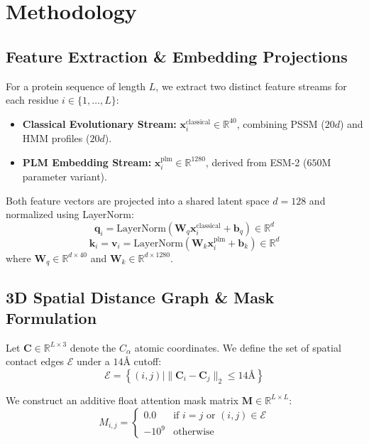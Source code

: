\documentclass[10pt,journal,compsoc]{IEEEtran}
\begin{document}
\section{Methodology}

\subsection{Feature Extraction \& Embedding Projections}
For a protein sequence of length $L$, we extract two distinct feature streams for each residue $i \in \{1, \dots, L\}$:
\begin{itemize}
    \item \textbf{Classical Evolutionary Stream:} $\mathbf{x}_i^{\text{classical}} \in \mathbb{R}^{40}$, combining PSSM ($20d$) and HMM profiles ($20d$).
    \item \textbf{PLM Embedding Stream:} $\mathbf{x}_i^{\text{plm}} \in \mathbb{R}^{1280}$, derived from ESM-2 ($650\text{M}$ parameter variant).
\end{itemize}

Both feature vectors are projected into a shared latent space $d = 128$ and normalized using LayerNorm:
\begin{equation}
\mathbf{q}_i = \text{LayerNorm}(\mathbf{W}_q \mathbf{x}_i^{\text{classical}} + \mathbf{b}_q) \in \mathbb{R}^d
\end{equation}
\begin{equation}
\mathbf{k}_i = \mathbf{v}_i = \text{LayerNorm}(\mathbf{W}_k \mathbf{x}_i^{\text{plm}} + \mathbf{b}_k) \in \mathbb{R}^d
\end{equation}
where $\mathbf{W}_q \in \mathbb{R}^{d \times 40}$ and $\mathbf{W}_k \in \mathbb{R}^{d \times 1280}$.

\subsection{3D Spatial Distance Graph \& Mask Formulation}
Let $\mathbf{C} \in \mathbb{R}^{L \times 3}$ denote the $C_\alpha$ atomic coordinates. We define the set of spatial contact edges $\mathcal{E}$ under a $14\text{Å}$ cutoff:
\begin{equation}
\mathcal{E} = \left\{ (i, j) \mid \|\mathbf{C}_i - \mathbf{C}_j\|_2 \le 14\text{Å} \right\}
\end{equation}

We construct an additive float attention mask matrix $\mathbf{M} \in \mathbb{R}^{L \times L}$:
\begin{equation}
M_{i, j} = 
\begin{cases} 
0.0 & \text{if } i = j \text{ or } (i, j) \in \mathcal{E} \\
-10^9 & \text{otherwise}
\end{cases}
\end{equation}
\end{document}
